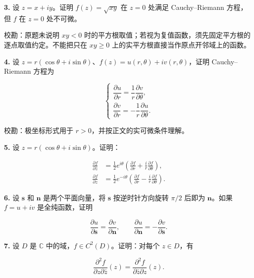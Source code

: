 \documentclass[11pt,a4paper]{article}
\begin{document}
\par{}
\noindent\textbf{3.} 设 \(z=x+iy\)。证明 \(f(z)=\sqrt{xy}\) 在 \(z=0\) 处满足
Cauchy--Riemann 方程，但 \(f\) 在 \(z=0\) 处不可微。

校勘：原题未说明 \(xy<0\)
时的平方根取值；若视为复值函数，须先固定平方根的逐点取值约定。不能把只在
\(xy\ge0\) 上的实平方根直接当作原点开邻域上的函数。

\par{}
\noindent\textbf{4.} 设
\(z=r(\cos\theta+i\sin\theta)\)、\(f(z)=u(r,\theta)+iv(r,\theta)\)，证明
Cauchy--Riemann 方程为

\[
\begin{cases}
\dfrac{\partial u}{\partial r}=\dfrac1r\dfrac{\partial v}{\partial\theta},\\[4pt]
\dfrac{\partial v}{\partial r}=-\dfrac1r\dfrac{\partial u}{\partial\theta}.
\end{cases}
\]

校勘：极坐标形式用于 \(r>0\)，并按正文的实可微条件理解。

\par{}
\noindent\textbf{5.} 设 \(z=r(\cos\theta+i\sin\theta)\)。证明：

\[
\begin{aligned}
\frac{\partial f}{\partial\bar z}&=\frac12e^{i\theta}\left(\frac{\partial f}{\partial r}+\frac ir\frac{\partial f}{\partial\theta}\right),\\
\frac{\partial f}{\partial z}&=\frac12e^{-i\theta}\left(\frac{\partial f}{\partial r}-\frac ir\frac{\partial f}{\partial\theta}\right).
\end{aligned}
\]

\par{}
\noindent\textbf{6.} 设 \(\boldsymbol s\) 和 \(\boldsymbol n\) 是两个平面向量，将
\(\boldsymbol s\) 按逆时针方向旋转 \(\pi/2\) 后即为
\(\boldsymbol n\)。如果 \(f=u+iv\) 是全纯函数，证明

\[
\frac{\partial u}{\partial\boldsymbol s}=\frac{\partial v}{\partial\boldsymbol n},\qquad
\frac{\partial u}{\partial\boldsymbol n}=-\frac{\partial v}{\partial\boldsymbol s}.
\]

\par{}
\noindent\textbf{7.} 设 \(D\) 是 \(\mathbb C\)
中的域，\(f\in C^2(D)\)。证明：对每个 \(z\in D\)，有

\[
\frac{\partial^2f}{\partial z\partial\bar z}(z)=\frac{\partial^2f}{\partial\bar z\partial z}(z).
\]
\end{document}
